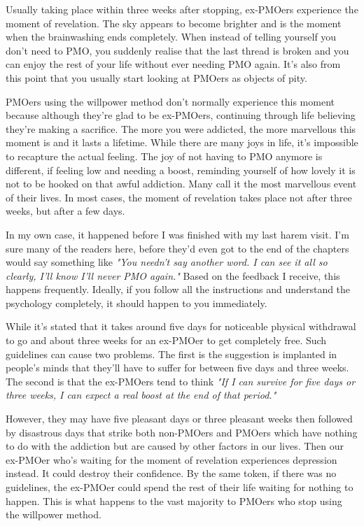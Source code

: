 \documentclass[easypeasy.tex]{subfiles}
\begin{document}
Usually taking place within three weeks after stopping, ex-PMOers experience the moment of revelation. The sky appears to become brighter and is the moment when the brainwashing ends completely. When instead of telling yourself you don't need to PMO, you suddenly realise that the last thread is broken and you can enjoy the rest of your life without ever needing PMO again. It's also from this point that you usually start looking at PMOers as objects of pity.

PMOers using the willpower method don't normally experience this moment because although they're glad to be ex-PMOers, continuing through life believing they're making a sacrifice. The more you were addicted, the more marvellous this moment is and it lasts a lifetime. While there are many joys in life, it's impossible to recapture the actual feeling. The joy of not having to PMO anymore is different, if feeling low and needing a boost, reminding yourself of how lovely it is not to be hooked on that awful addiction. Many call it the most marvellous event of their lives. In most cases, the moment of revelation takes place not after three weeks, but after a few days. 

In my own case, it happened before I was finished with my last harem visit. I'm sure many of the readers here, before they'd even got to the end of the chapters would say something like \textit{"You needn't say another word. I can see it all so clearly, I'll know I'll never PMO again."} Based on the feedback I receive, this happens frequently. Ideally, if you follow all the instructions and understand the psychology completely, it should happen to you immediately.

While it's stated that it takes around five days for noticeable physical withdrawal to go and about three weeks for an ex-PMOer to get completely free. Such guidelines can cause two problems. The first is the suggestion is implanted in people's minds that they'll have to suffer for between five days and three weeks. The second is that the ex-PMOers tend to think \textit{"If I can survive for five days or three weeks, I can expect a real boost at the end of that period."}

However, they may have five pleasant days or three pleasant weeks then followed by disastrous days that strike both non-PMOers and PMOers which have nothing to do with the addiction but are caused by other factors in our lives. Then our ex-PMOer who's waiting for the moment of revelation experiences depression instead. It could destroy their confidence. By the same token, if there was no guidelines, the ex-PMOer could spend the rest of their life waiting for nothing to happen. This is what happens to the vast majority to PMOers who stop using the willpower method.
\end{document}
